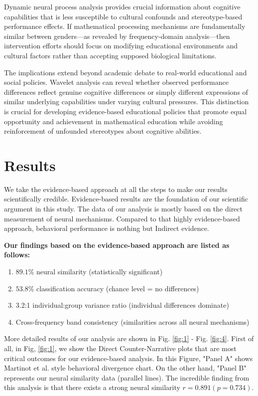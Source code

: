 \documentclass[pdflatex,reference]{sn-jnl}%
\theoremstyle{thmstyleone}%
\theoremstyle{thmstyletwo}%
\theoremstyle{thmstylethree}%
\begin{document}
Dynamic neural process analysis provides crucial information about cognitive capabilities that is less susceptible to cultural confounds and stereotype-based performance effects. If mathematical processing mechanisms are fundamentally similar between genders—as revealed by frequency-domain analysis—then intervention efforts should focus on modifying educational environments and cultural factors rather than accepting supposed biological limitations.

The implications extend beyond academic debate to real-world educational and social policies. Wavelet analysis can reveal whether observed performance differences reflect genuine cognitive differences or simply different expressions of similar underlying capabilities under varying cultural pressures. This distinction is crucial for developing evidence-based educational policies that promote equal opportunity and achievement in mathematical education while avoiding reinforcement of unfounded stereotypes about cognitive abilities.


\section{Results}\label{sec2}
We take the evidence-based approach at all the steps to make our results scientifically credible. Evidence-based results are the foundation of our scientific argument in this study. The data of our analysis is mostly based on the direct measurement of neural mechanisms. Compared to that highly evidence-based approach, behavioral performance is nothing but Indirect evidence. 

\medskip\noindent
\textbf{Our findings based on the evidence-based approach are listed as follows:}
\begin{enumerate}
\item $89.1$\% neural similarity (statistically significant)
\item $53.8$\% classification accuracy (chance level = no differences)
\item 3.2:1 individual:group variance ratio (individual differences dominate)
\item Cross-frequency band consistency (similarities across all neural mechanisms)
\end{enumerate}

\medskip\noindent
More detailed results of our analysis are shown in Fig. \ref{fig:1} - Fig. \ref{fig:4}. First of all, in Fig, \ref{fig:1}, we show the Direct Counter-Narrative plots that are most critical outcomes for our evidence-based analysis. In this Figure, "Panel A" shows Martinot et al. style behavioral divergence chart. On the other hand, "Panel B" represents our neural similarity data (parallel lines). The incredible finding from this analysis is that there exists a strong neural similarity $r = 0.891 (p = 0.734)$. 
\end{document}
